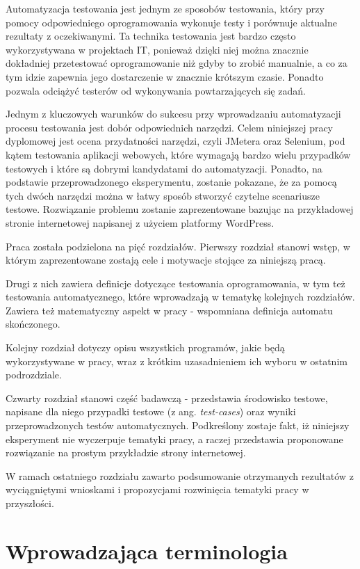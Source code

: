 \documentclass[12pt]{report}
\theoremstyle{definition}
\begin{document}
Automatyzacja testowania jest jednym ze sposobów testowania, który przy pomocy odpowiedniego oprogramowania wykonuje testy i porównuje aktualne rezultaty z oczekiwanymi. Ta technika testowania jest bardzo często wykorzystywana w projektach IT, ponieważ dzięki niej można znacznie dokładniej przetestować oprogramowanie niż gdyby to zrobić manualnie, a co za tym idzie zapewnia jego dostarczenie w znacznie krótszym czasie. Ponadto pozwala odciążyć testerów od wykonywania powtarzających się zadań. 


Jednym z kluczowych warunków do sukcesu przy wprowadzaniu automatyzacji procesu testowania jest dobór odpowiednich narzędzi. Celem niniejszej pracy dyplomowej jest ocena przydatności narzędzi, czyli JMetera oraz Selenium, pod kątem testowania aplikacji webowych, które wymagają bardzo wielu przypadków testowych i które są dobrymi kandydatami do automatyzacji. Ponadto, na podstawie przeprowadzonego eksperymentu, zostanie pokazane, że za pomocą tych dwóch narzędzi można w łatwy sposób stworzyć czytelne scenariusze testowe.  Rozwiązanie problemu zostanie zaprezentowane bazując na przykładowej stronie internetowej napisanej z użyciem platformy WordPress. 


Praca została podzielona na pięć rozdziałów. Pierwszy rozdział stanowi wstęp, w którym zaprezentowane zostają cele i motywacje stojące za niniejszą pracą. 


Drugi z nich zawiera definicje dotyczące testowania oprogramowania, w tym też testowania automatycznego, które wprowadzają w tematykę kolejnych rozdziałów. Zawiera też matematyczny aspekt w pracy - wspomniana definicja automatu skończonego.


Kolejny rozdział dotyczy opisu wszystkich programów, jakie będą wykorzystywane w pracy, wraz z krótkim uzasadnieniem ich wyboru w ostatnim podrozdziale. 


Czwarty rozdział stanowi część badawczą - przedstawia środowisko testowe, napisane dla niego przypadki testowe (z ang. \textit{test-cases}) oraz wyniki przeprowadzonych testów automatycznych. Podkreślony zostaje fakt, iż niniejszy eksperyment nie wyczerpuje tematyki pracy, a raczej przedstawia proponowane rozwiązanie na prostym przykładzie strony internetowej.

W ramach ostatniego rozdziału zawarto podsumowanie otrzymanych rezultatów z wyciągniętymi wnioskami i propozycjami rozwinięcia tematyki pracy w przyszłości.


\chapter{Wprowadzająca terminologia} \ \ \
\end{document}

